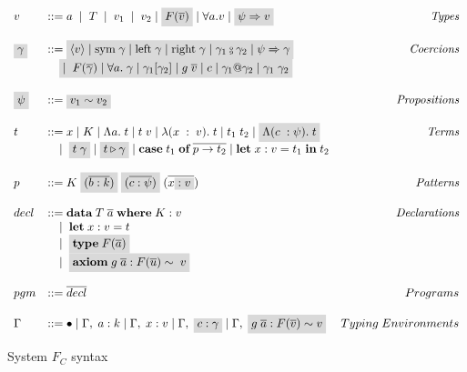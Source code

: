 \begin{figure}
\small
\[
\begin{array}{l l r}
    v &::= a \;  \; | \;  \; T \;  \; | \;  \; v_1 \;  \; | \;  \; v_2  \; | \;
    \highlight{F(\overline{v})}  \; | \;  \forall a. v  \; | \; \highlight{\psi
    \Rightarrow v} &\textit{Types}\\ \\
    \highlight{\gamma} &::= \highlight{\langle v \rangle \; | \; \text{sym} \; \gamma \; | \;
    \text{left} \; \gamma \; | \; \text{right} \; \gamma \; | \; \gamma_1
    \fctrans
    \gamma_2 \; | \; \psi \Rightarrow \gamma} &\textit{Coercions} \\
    \; &\quad \highlight{| \; \; F(\overline{\gamma}) \; | \; \forall a . \; \gamma \; | \;
    \gamma_1 [\gamma_2] \; | \; g \; \overline{v} \; | \; c \; | \; \gamma_1 @
    \gamma_2 \; | \; \gamma_1 \; \gamma_2} \\ \\
    \highlight{\psi} &::= \highlight{v_1 \sim v_2} &\textit{Propositions}\\ \\
    t &::= x \; | \; K \; | \; \Lambda a . \; t \; | \; t \; v \; | \;
    \lambda(x\; : \; v). \; t \; | \; t_1 \; t_2 \; | \; \highlight{\Lambda(c \; : \psi).
    \; t} &\textit{Terms} \\
          &\quad | \; \; \highlight{t \; \gamma} \; | \; \highlight{t \triangleright \gamma} \; | \;
    \textbf{case} \; t_1 \; \textbf{of} \; \overline{p \rightarrow t_2} \; | \;
    \textbf{let} \; x : v = t_1 \; \textbf{in} \; t_2 \\ \\
    p &::= K \; \highlight{(\overline{b : k})} \; \highlight{(\overline{c : \psi})} \;
    (\overline{x \highlight{: v}}) &\textit{Patterns}\\ \\
    decl &::= \textbf{data} \; T \; \overline{a} \; \textbf{where} \; K : v
         &\textit{Declarations}\\
         &\quad | \; \; \textbf{let} \; x : v = t \\
         &\quad | \; \; \highlight{\textbf{type} \; F(\overline{a})} \\
         &\quad | \; \; \highlight{\textbf{axiom} \; g \; \overline{a} :
         F(\overline{u}) \sim \; v} \\ \\
    pgm &::= \overline{decl} &Programs \\ \\
    \Gamma &::= \bullet \mid \Gamma, \; a : k \mid \Gamma, \; x : v \mid \Gamma,
    \; \highlight{c : \gamma} \mid \Gamma, \; \highlight{g \; \overline{a} :
    F(\overline{v}) \sim v} &Typing \; Environments
\end{array}
\]
\caption{System $F_C$ syntax}
\label{fc-syntax}
\end{figure}

